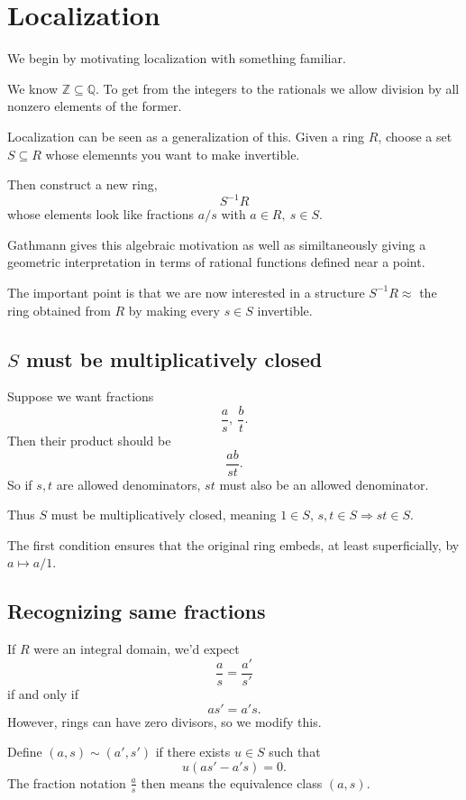 \documentclass[11pt]{article}
\begin{document}
\section{Localization} 

We begin by motivating localization 
with something familiar. 

We know $\mathbb Z \subseteq \mathbb Q$. 
To get from the integers to the rationals we 
allow division by all nonzero elements of the former. 

Localization can be seen as a generalization of 
this. Given a ring $R$, choose a set 
$S \subseteq R$ whose elemennts you want to make 
invertible. 

Then construct a new ring, 
\[
    S^{-1}R 
\]
whose elements look like fractions 
$a/s$ with $a\in R, \ s \in S$. 

Gathmann gives this algebraic motivation as well as 
similtaneously giving a geometric interpretation 
in terms of rational functions defined near a 
point. 

The important point is that we are 
now interested in a structure $S^{-1}R \approx$ the 
ring obtained from $R$ by making every $s \in S$ invertible. 

\subsection{$S$ must be multiplicatively closed}
Suppose we want fractions 
\[
    \frac{a}{s}, \ \frac{b}{t}. 
\]
Then their product should be 
\[
    \frac{ab}{st}. 
\]
So if $s,t$ are allowed denominators, $st$ must also 
be an allowed denominator. 

Thus $S$ must be multiplicatively closed, meaning 
$1 \in S$, $s,t \in S \Rightarrow st \in S$. 

The first condition ensures that the 
original ring embeds, at least superficially, by 
$a \mapsto a/1$. 

\subsection{Recognizing same fractions}
If $R$ were an integral domain, we'd expect 
\[
    \frac{a}{s} = \frac{a'}{s'}
\]
if and only if 
\[
    as' = a's. 
\]
However, rings can have zero divisors, so we modify 
this. 

Define $(a,s) \sim (a',s')$ if there exists 
$u \in S$ such that 
\[
    u(as' - a's) = 0. 
\]
The fraction notation $\frac{a}{s}$ then means the 
equivalence class $(a,s)$. 
\end{document}
